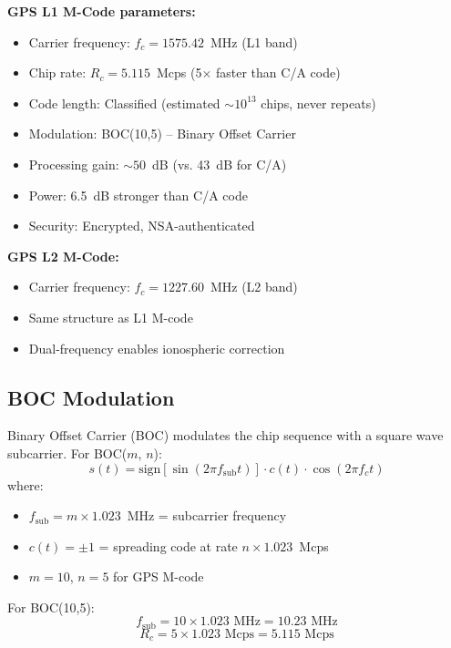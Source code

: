 \textbf{GPS L1 M-Code parameters:}
\begin{itemize}
\item Carrier frequency: $f_c = 1575.42$~MHz (L1 band)
\item Chip rate: $R_c = 5.115$~Mcps (5$\times$ faster than C/A code)
\item Code length: Classified (estimated $\sim 10^{13}$ chips, never repeats)
\item Modulation: BOC(10,5) -- Binary Offset Carrier
\item Processing gain: $\sim 50$~dB (vs. 43~dB for C/A)
\item Power: 6.5~dB stronger than C/A code
\item Security: Encrypted, NSA-authenticated
\end{itemize}

\textbf{GPS L2 M-Code:}
\begin{itemize}
\item Carrier frequency: $f_c = 1227.60$~MHz (L2 band)
\item Same structure as L1 M-code
\item Dual-frequency enables ionospheric correction
\end{itemize}

\subsection{BOC Modulation}

Binary Offset Carrier (BOC) modulates the chip sequence with a square wave subcarrier. For BOC($m$, $n$):
\begin{equation}
s(t) = \text{sign}[\sin(2\pi f_{\text{sub}} t)] \cdot c(t) \cdot \cos(2\pi f_c t)
\end{equation}
where:
\begin{itemize}
\item $f_{\text{sub}} = m \times 1.023$~MHz = subcarrier frequency
\item $c(t) = \pm 1$ = spreading code at rate $n \times 1.023$~Mcps
\item $m = 10$, $n = 5$ for GPS M-code
\end{itemize}

For BOC(10,5):
\begin{equation}
f_{\text{sub}} = 10 \times 1.023 \text{ MHz} = 10.23 \text{ MHz}
\end{equation}
\begin{equation}
R_c = 5 \times 1.023 \text{ Mcps} = 5.115 \text{ Mcps}
\end{equation}

